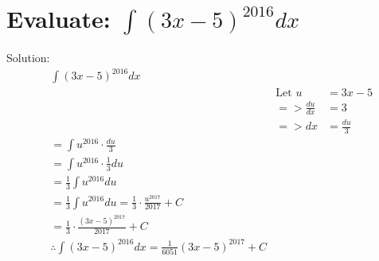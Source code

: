 \documentclass{article}
\begin{document}
\section{Evaluate: $\int (3x-5)^{2016} dx$} Solution:
\begin{align*}
     & \int (3x-5)^{2016} dx                                                                                            \\
     &                                                                              & \text{Let } u    & = 3x - 5       \\
     &                                                                              & => \frac{du}{dx} & = 3            \\
     &                                                                              & => dx            & = \frac{du}{3} \\
     & = \int u^{2016} \cdot \frac{du}{3}                                                                               \\
     & = \int u^{2016} \cdot \frac{1}{3} du                                                                             \\
     & = \frac{1}{3} \int u^{2016} du                                                                                   \\
     & = \frac{1}{3} \int u^{2016} du = \frac{1}{3} \cdot \frac{u^{2017}}{2017} + C                                     \\
     & = \frac{1}{3} \cdot \frac{(3x - 5)^{2017}}{2017} + C                                                             \\
     & \therefore \int (3x-5)^{2016} dx = \frac{1}{6051} (3x - 5)^{2017} + C
\end{align*}
\end{document}
